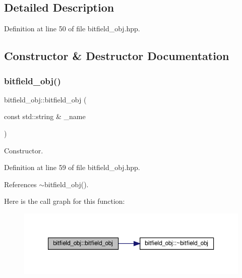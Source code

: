 \subsection{Detailed Description}


Definition at line 50 of file bitfield\+\_\+obj.\+hpp.



\subsection{Constructor \& Destructor Documentation}
\mbox{\label{classbitfield__obj_ab89190bae39ae2a0f8573c91016efa41}} 
\subsubsection{\texorpdfstring{bitfield\+\_\+obj()}{bitfield\_obj()}}
{\footnotesize\ttfamily bitfield\+\_\+obj\+::bitfield\+\_\+obj (\begin{DoxyParamCaption}\item[{const std\+::string \&}]{\+\_\+name }\end{DoxyParamCaption})\hspace{0.3cm}{\ttfamily [inline]}}



Constructor. 



Definition at line 59 of file bitfield\+\_\+obj.\+hpp.



References $\sim$bitfield\+\_\+obj().

Here is the call graph for this function\+:
\nopagebreak
\begin{figure}[H]
\begin{center}
\leavevmode
\includegraphics[width=350pt]{da/d41/classbitfield__obj_ab89190bae39ae2a0f8573c91016efa41_cgraph}
\end{center}
\end{figure}
\mbox{\label{classbitfield__obj_ae308c7cff55b47ec402a9e8d37bec04d}} 
